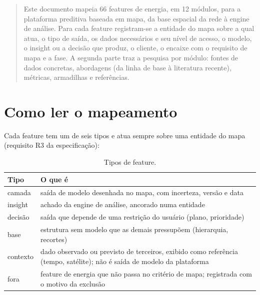 \documentclass[10pt,a4paper,oneside]{article}
\begin{document}
\rosto

\begin{abstract}
Este documento mapeia 66 features de energia, em 12 módulos, para a
plataforma preditiva baseada em mapa, da base espacial da rede à engine de
análise. Para
cada feature registram-se a entidade do mapa sobre a qual atua, o tipo de
saída, os dados necessários e seu nível de acesso, o modelo, o insight ou a
decisão que produz, o cliente, o encaixe com o requisito de mapa e a fase. A
segunda parte traz a pesquisa por módulo: fontes de dados concretas,
abordagens (da linha de base à literatura recente), métricas, armadilhas e
referências.
\end{abstract}

\tableofcontents
\newpage

\section{Como ler o mapeamento}

Cada feature tem um de seis tipos e atua sempre sobre uma entidade do mapa
(requisito R3 da especificação):

\begin{table}[H]
\centering
\caption{Tipos de feature.}
\begin{tabularx}{\textwidth}{l L}
\toprule
\textbf{Tipo} & \textbf{O que é} \\
\midrule
camada & saída de modelo desenhada no mapa, com incerteza, versão e data \\
insight & achado da engine de análise, ancorado numa entidade \\
decisão & saída que depende de uma restrição do usuário (plano, prioridade) \\
base & estrutura sem modelo que as demais pressupõem (hierarquia, recortes) \\
contexto & dado observado ou previsto de terceiros, exibido como referência
  (tempo, satélite); não é saída de modelo da plataforma \\
fora & feature de energia que não passa no critério de mapa; registrada com
  o motivo da exclusão \\
\bottomrule
\end{tabularx}
\end{table}
\end{document}
